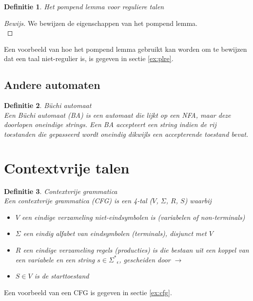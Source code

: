 \documentclass[a4paper]{article}
\newtheorem{tdefinitie}{Definitie}[section]
\newenvironment{definitie}[1]%
  {\begin{mdframed}[backgroundcolor=silver,
    topline=false,
    rightline=false,
    leftline=false,
    bottomline=false]\begin{tdefinitie}#1\\\normalfont}%
  {\end{tdefinitie}\end{mdframed}}
\newenvironment{bewijs}[1]%
  {\begin{mdframed}[topline=true,
    rightline=true,
    leftline=true,
    bottomline=true]\begin{proof}[Bewijs]#1\\[.2cm]\normalfont}%
  {\end{proof}\end{mdframed}}
\newcommand{\sstar}{\ensuremath{\Sigma^*}}
\begin{document}
\begin{definitie}{Het pompend lemma voor reguliere talen}
  
\end{definitie}

\begin{bewijs}{We bewijzen de eigenschappen van het pompend lemma.}
  
\end{bewijs}

Een voorbeeld van hoe het pompend lemma gebruikt kan worden om te bewijzen dat een taal niet-regulier is, is gegeven in sectie \ref{ex:plre}.


\subsection{Andere automaten}

\begin{definitie}{B\"uchi automaat}
  Een B\"uchi automaat (BA) is een automaat die lijkt op een NFA, maar deze doorlopen oneindige strings. Een BA accepteert een string indien de rij toestanden die gepasseerd wordt oneindig dikwijls een accepterende toestand bevat.
\end{definitie}

\newpage\section{Contextvrije talen}

\begin{definitie}{Contextvrije grammatica}
  Een contextvrije grammatica (CFG) is een 4-tal ($V$, $\Sigma$, $R$, $S$) waarbij
  \begin{itemize}
  \item $V$ een eindige verzameling niet-eindsymbolen is (variabelen of non-terminals)
  \item $\Sigma$ een eindig alfabet van eindsymbolen (terminals), disjunct met $V$
  \item $R$ een eindige verzameling regels (producties) is die bestaan uit een koppel van een variabele en een string $s \in \sstar_\epsilon$, gescheiden door $\rightarrow$
  \item $S \in V$ is de starttoestand
  \end{itemize}
\end{definitie}

Een voorbeeld van een CFG is gegeven in sectie \ref{ex:cfg}.
\end{document}
